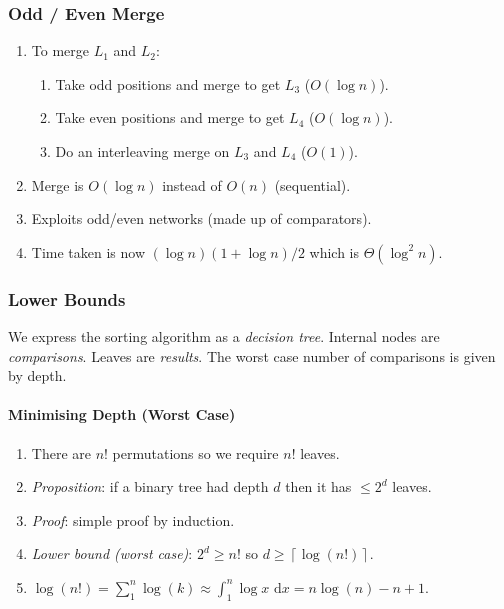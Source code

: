 \documentclass[twocolumn,english]{article}
\begin{document}
\subsubsection{Odd / Even Merge}
\begin{enumerate}
\item To merge $L_{1}$ and $L_{2}$:

\begin{enumerate}
\item Take odd positions and merge to get $L_{3}$ ($O\left(\log n\right)$).
\item Take even positions and merge to get $L_{4}$ ($O\left(\log n\right)$).
\item Do an interleaving merge on $L_{3}$ and $L_{4}$ ($O\left(1\right)$).
\end{enumerate}
\item Merge is $O\left(\log n\right)$ instead of $O\left(n\right)$ (sequential).
\item Exploits odd/even networks (made up of comparators).
\item Time taken is now $\left(\log n\right)\left(1+\log n\right)/2$ which
is $\Theta\left(\log^{2}n\right)$.
\end{enumerate}

\subsubsection{Lower Bounds}

We express the sorting algorithm as a \emph{decision tree}. Internal
nodes are \emph{comparisons}. Leaves are \emph{results}. The worst
case number of comparisons is given by depth.


\paragraph{Minimising Depth (Worst Case)}
\begin{enumerate}
\item There are $n!$ permutations so we require $n!$ leaves.
\item \emph{Proposition}: if a binary tree had depth $d$ then it has $\leq2^{d}$
leaves.
\item \emph{Proof}: simple proof by induction.
\item \emph{Lower bound (worst case)}: $2^{d}\geq n!$ so $d\geq\left\lceil \log\left(n!\right)\right\rceil $.
\item $\log\left(n!\right)=\sum_{1}^{n}\log\left(k\right)\approx\int_{1}^{n}\log x\mbox{ d}x=n\log\left(n\right)-n+1$.
\end{enumerate}
\end{document}
